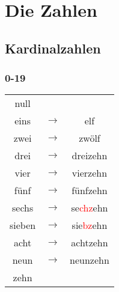 \documentclass[main.tex]{subfiles}
\begin{document}
\chapter{Die Zahlen}
\section{Kardinalzahlen}
\begin{minipage}{0,5\textwidth}
\subsection{0-19}
\begin{tabular}{ccc}

null &  &  \\ 

eins & $\rightarrow$ & elf \\ 
 
zwei & $\rightarrow$ & zwölf \\ 

drei & $\rightarrow$ & dreizehn \\ 

vier & $\rightarrow$ & vierzehn \\ 

fünf & $\rightarrow$ & fünfzehn \\ 

sechs & $\rightarrow$ & se\textcolor{red}{chz}ehn \\ 

sieben & $\rightarrow$ & sie\textcolor{red}{bz}ehn \\ 

acht & $\rightarrow$ & achtzehn \\ 

neun & $\rightarrow$ & neunzehn \\ 
 
zehn &  &  \\ 
 
\end{tabular} 

\end{minipage}
\end{document}
